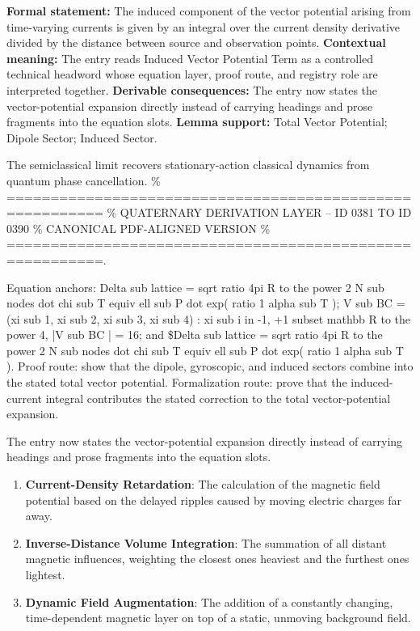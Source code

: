 \begingroup\footnotesize\setlength{\emergencystretch}{3em}\sloppy
\textbf{Formal statement:} The induced component of the vector potential arising from time-varying currents is given by an integral over the current density derivative divided by the distance between source and observation points. \textbf{Contextual meaning:} The entry reads Induced Vector Potential Term as a controlled technical headword whose equation layer, proof route, and registry role are interpreted together. \textbf{Derivable consequences:} The entry now states the vector-potential expansion directly instead of carrying headings and prose fragments into the equation slots. \textbf{Lemma support:} Total Vector Potential; Dipole Sector; Induced Sector.\par
\endgroup

The semiclassical limit recovers stationary-action classical dynamics from quantum phase cancellation. \% ========================================================= \% QUATERNARY DERIVATION LAYER -- ID 0381 TO ID 0390 \% CANONICAL PDF-ALIGNED VERSION \% =========================================================.

Equation anchors: Delta sub lattice = sqrt ratio 4pi R to the power 2 N sub nodes dot chi sub T equiv ell sub P dot exp( ratio 1 alpha sub T ); V sub BC = (xi sub 1, xi sub 2, xi sub 3, xi sub 4) : xi sub i in -1, +1 subset mathbb R to the power 4, |V sub BC | = 16; and \$Delta sub lattice = sqrt ratio 4pi R to the power 2 N sub nodes dot chi sub T equiv ell sub P dot exp( ratio 1 alpha sub T ). Proof route: show that the dipole, gyroscopic, and induced sectors combine into the stated total vector potential. Formalization route: prove that the induced-current integral contributes the stated correction to the total vector-potential expansion.

The entry now states the vector-potential expansion directly instead of carrying headings and prose fragments into the equation slots.
\endgroup

\begin{enumerate}[leftmargin=1.6em,itemsep=6pt,topsep=4pt]
\item \textbf{Current-Density Retardation}: The calculation of the magnetic field potential based on the delayed ripples caused by moving electric charges far away.
\item \textbf{Inverse-Distance Volume Integration}: The summation of all distant magnetic influences, weighting the closest ones heaviest and the furthest ones lightest.
\item \textbf{Dynamic Field Augmentation}: The addition of a constantly changing, time-dependent magnetic layer on top of a static, unmoving background field.
\end{enumerate}

